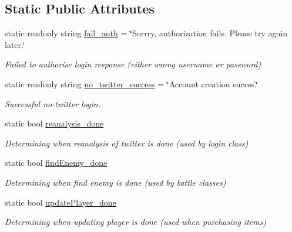 \subsection*{Static Public Attributes}
\begin{DoxyCompactItemize}
\item 
static readonly string \mbox{\hyperlink{class_server_ab625c993d6d1ab40721d3ca33af00cb8}{fail\+\_\+auth}} = \char`\"{}Sorrry, authorization fails. Please try again later.\char`\"{}
\begin{DoxyCompactList}\small\item\em Failed to authorise login response (either wrong username or password) \end{DoxyCompactList}\item 
static readonly string \mbox{\hyperlink{class_server_a68768a2b0fbd0595e8690908bf8bb66b}{no\+\_\+twitter\+\_\+success}} = \char`\"{}Account creation succss.\char`\"{}
\begin{DoxyCompactList}\small\item\em Successful no-\/twitter login. \end{DoxyCompactList}\item 
static bool \mbox{\hyperlink{class_server_a42280d186d88088d0f060ccb02974ae9}{reanalysis\+\_\+done}}
\begin{DoxyCompactList}\small\item\em Determining when reanalysis of twitter is done (used by login class) \end{DoxyCompactList}\item 
static bool \mbox{\hyperlink{class_server_a914251970cab3255c343d60a6a7a55f5}{find\+Enemy\+\_\+done}}
\begin{DoxyCompactList}\small\item\em Determining when find enemy is done (used by battle classes) \end{DoxyCompactList}\item 
static bool \mbox{\hyperlink{class_server_acf78dae58011f4406003d79e6df7e3ef}{update\+Player\+\_\+done}}
\begin{DoxyCompactList}\small\item\em Determining when updating player is done (used when purchasing items) \end{DoxyCompactList}\end{DoxyCompactItemize}

